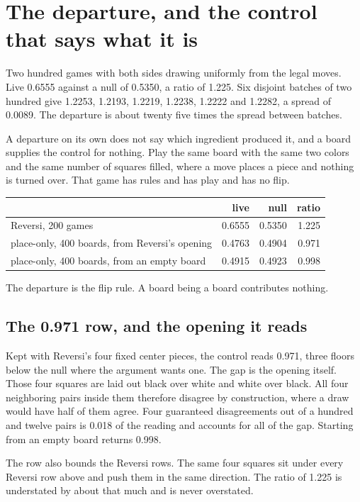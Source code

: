 \section{The departure, and the control that says what it is}

Two hundred games with both sides drawing uniformly from the legal moves. Live 0.6555 against a null
of 0.5350, a ratio of 1.225. Six disjoint batches of two hundred give 1.2253, 1.2193, 1.2219, 1.2238,
1.2222 and 1.2282, a spread of 0.0089. The departure is about twenty five times the spread between
batches.

A departure on its own does not say which ingredient produced it, and a board supplies the control
for nothing. Play the same board with the same two colors and the same number of squares filled,
where a move places a piece and nothing is turned over. That game has rules and has play and has no
flip.

\begin{center}
\begin{tabular}{@{}lrrr@{}}
\toprule
& live & null & ratio \\
\midrule
Reversi, 200 games & 0.6555 & 0.5350 & 1.225 \\
place-only, 400 boards, from Reversi's opening & 0.4763 & 0.4904 & 0.971 \\
place-only, 400 boards, from an empty board & 0.4915 & 0.4923 & 0.998 \\
\bottomrule
\end{tabular}
\end{center}

The departure is the flip rule. A board being a board contributes nothing.

\subsection{The 0.971 row, and the opening it reads}

Kept with Reversi's four fixed center pieces, the control reads 0.971, three floors below the null
where the argument wants one. The gap is the opening itself. Those four
squares are laid out black over white and white over black. All four neighboring pairs inside them
therefore disagree by construction, where a draw would have half of them agree. Four guaranteed
disagreements out of a hundred and twelve pairs is 0.018 of the reading and accounts for all of the
gap. Starting from an empty board returns 0.998.

The row also bounds the Reversi rows. The same four squares sit under every Reversi row
above and push them in the same direction. The ratio of 1.225 is understated by about that much and
is never overstated.

